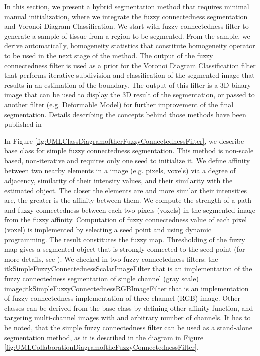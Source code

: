 In this section, we present a hybrid segmentation method that requires minimal
manual initialization, where we integrate the fuzzy connectedness segmentation
and Voronoi Diagram Classification. We start with fuzzy connectedness filter
to generate a sample of tissue from a region to be segmented. From the sample,
we derive automatically, homogeneity statistics that constitute homogeneity
operator to be used in the next stage of the method. The output of the fuzzy 
connectedness filter is used as a prior for the Voronoi Diagram Classification 
filter that performs iterative subdivision and classification of the segmented
image that results in an estimation of the boundary. The output of this filter
is a 3D binary image that can be used to display the 3D result of the
segmentation, or passed to another filter (e.g. Deformable Model) for further
improvement of the final segmentation. Details describing the concepts behind those methods 
have been published in
\cite{Angelini2002,Udupa2002,Jin2002,Imielinska2001,Imielinska2000a,Imielinska2000b}

In Figure \ref{fig:UMLClassDiagramoftherFuzzyConnectednessFilter}, we describe 
base class for simple fuzzy connectedness segmentation. This method is non-scale 
based, non-iterative and requires only one seed to initialize it. We define affinity 
between two nearby elements in a image (e.g. pixels, voxels) via a degree of adjacency, 
similarity of their intensity values, and their similarity with the estimated object. 
The closer the elements are and more similar their intensities are, the greater is 
the affinity between them. We compute the strength of a path and fuzzy connectedness 
between each two pixels (voxels) in the segmented image from the fuzzy affinity. 
Computation of fuzzy connectedness value of each pixel (voxel) is implemented
by selecting a seed point and using dynamic programming. The result constitutes the fuzzy
map. Thresholding of the fuzzy map gives a segmented object that is strongly connected
to the seed point (for more details, see \cite{Udupa1996}). We checked in two fuzzy 
connectedness filters: the itkSimpleFuzzyConnectednessScalarImageFilter that is an
implementation of the fuzzy connectedness segmentation of single channel (gray scale) 
image;itkSimpleFuzzyConnectednessRGBImageFilter that is an implementation of fuzzy
connectedness implementation of three-channel (RGB) image. Other classes can be derived 
from the base class by defining other affinity function, and targeting multi-channel
images with and arbitrary number of channels. It has to be noted, that the simple fuzzy 
connectedness filter can be used as a stand-alone segmentation method,
as it is described in the diagram in Figure 
\ref{fig:UMLCollaborationDiagramoftheFuzzyConnectednessFilter}.

